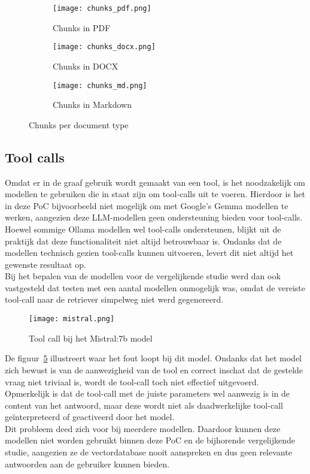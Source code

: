 \begin{figure}[H]
    \centering
    \begin{subfigure}{0.3\textwidth}
        \centering
        \texttt{[image: chunks\_pdf.png]}
        \caption{Chunks in PDF}
        \label{fig:chunks_pdf}
    \end{subfigure}
    \hfill
    \begin{subfigure}{0.3\textwidth}
        \centering
        \texttt{[image: chunks\_docx.png]}
        \caption{Chunks in DOCX}
        \label{fig:chunks_doc}
    \end{subfigure}
     \hfill
    \begin{subfigure}{0.3\textwidth}
        \centering
        \texttt{[image: chunks\_md.png]}
        \caption{Chunks in Markdown}
        \label{fig:chunks_md}
    \end{subfigure}
    \caption{Chunks per document type}
    \label{fig:driefiguren}
\end{figure}

\subsection{Tool calls}

Omdat er in de graaf gebruik wordt gemaakt van een tool, is het noodzakelijk om modellen te gebruiken die in staat zijn om tool-calls uit te voeren. Hierdoor is het in deze PoC bijvoorbeeld niet mogelijk om met Google's Gemma modellen te werken, aangezien deze LLM-modellen geen ondersteuning bieden voor tool-calls.
\\[1em]
Hoewel sommige Ollama modellen wel tool-calls ondersteunen, blijkt uit de praktijk dat deze functionaliteit niet altijd betrouwbaar is. Ondanks dat de modellen technisch gezien tool-calls kunnen uitvoeren, levert dit niet altijd het gewenste resultaat op.
\\[1em]
Bij het bepalen van de modellen voor de vergelijkende studie werd dan ook vastgesteld dat testen met een aantal modellen onmogelijk was, omdat de vereiste tool-call naar de retriever simpelweg niet werd gegenereerd. 

\begin{figure}[H]
    \texttt{[image: mistral.png]}
    \caption{Tool call bij het Mistral:7b model}
    \label{fig:Mistral}
\end{figure}

De figuur~\ref{fig:Mistral} illustreert waar het fout loopt bij dit model. Ondanks dat het model zich bewust is van de aanwezigheid van de tool en correct inschat dat de gestelde vraag niet triviaal is, wordt de tool-call toch niet effectief uitgevoerd.
\\[1em]
Opmerkelijk is dat de tool-call met de juiste parameters wel aanwezig is in de content van het antwoord, maar deze wordt niet als daadwerkelijke tool-call geïnterpreteerd of geactiveerd door het model.
\\[1em]
Dit probleem deed zich voor bij meerdere modellen. Daardoor kunnen deze modellen niet worden gebruikt binnen deze PoC en de bijhorende vergelijkende studie, aangezien ze de vectordatabase nooit aanspreken en dus geen relevante antwoorden aan de gebruiker kunnen bieden.

